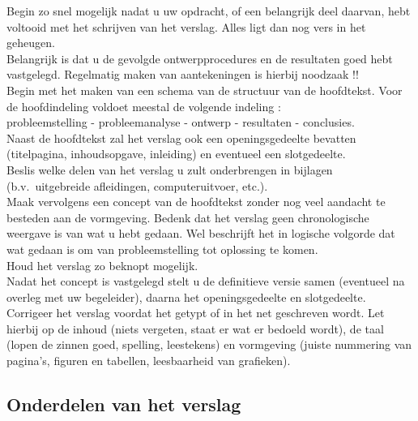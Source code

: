 Begin zo snel mogelijk nadat u uw opdracht, of een belangrijk deel daarvan, 
hebt voltooid met het schrijven van het verslag. Alles ligt dan nog vers in 
het geheugen. \\
Belangrijk is dat u de gevolgde ontwerpprocedures en de resultaten 
goed hebt vastgelegd. Regelmatig maken van aantekeningen is hierbij 
noodzaak !! \\
Begin met het maken van een schema van de structuur van de hoofdtekst. Voor de 
hoofdindeling voldoet meestal de volgende indeling :  \\
probleemstelling - probleemanalyse - ontwerp  
 - resultaten - conclusies.\\ 
Naast de hoofdtekst zal het verslag ook een openingsgedeelte bevatten 
(titelpagina, inhoudsopgave, inleiding) en eventueel een slotgedeelte. \\
Beslis welke delen van het verslag u zult onderbrengen in bijlagen
(b.v.\ uitgebreide afleidingen, computeruitvoer, etc.). \\
Maak vervolgens een concept van de hoofdtekst zonder nog veel aandacht te 
besteden aan de vormgeving. Bedenk dat het verslag geen chronologische weergave 
is van wat u hebt gedaan. Wel beschrijft het in logische volgorde dat wat gedaan is 
om van probleemstelling tot oplossing te komen. \\
Houd het verslag zo beknopt mogelijk. \\
Nadat het concept is vastgelegd stelt u de definitieve versie samen (eventueel 
na overleg met uw begeleider), daarna het openingsgedeelte en slotgedeelte. \\
Corrigeer het verslag voordat het getypt of in het net geschreven wordt. Let 
hierbij op de inhoud (niets vergeten, staat er wat er bedoeld wordt), de taal 
(lopen de zinnen goed, spelling, leestekens) en vormgeving (juiste nummering 
van pagina's, figuren en tabellen, leesbaarheid van grafieken).

\subsection{Onderdelen van het verslag }

